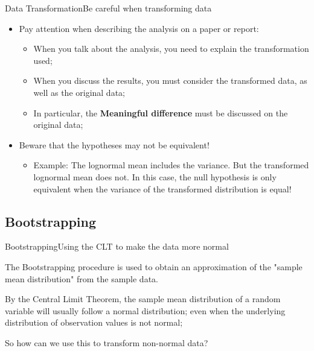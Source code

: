 \begin{frame}{Data Transformation}{Be careful when transforming data}
  \begin{itemize}
    \item Pay attention when describing the analysis on a paper or report:
    \begin{itemize}
      \item When you talk about the analysis, you need to explain the transformation used;

      \item When you discuss the results, you must consider the transformed data, as well as the original data;

      \item In particular, the {\bf Meaningful difference} must be discussed on the original data;
    \end{itemize}\bigskip

    \item Beware that the hypotheses may not be equivalent!
    \begin{itemize}
      \item Example: The lognormal mean includes the variance. But the transformed lognormal mean does not. In this case, the null hypothesis is only equivalent when the variance of the transformed distribution is equal!
    \end{itemize}
  \end{itemize}
\end{frame}

\subsection{Bootstrapping}

\begin{frame}{Bootstrapping}{Using the CLT to make the data more normal}

  The Bootstrapping procedure is used to obtain an approximation of the "sample mean distribution" from the sample data.\bigskip

  By the Central Limit Theorem, the sample mean distribution of a random variable will usually follow a normal distribution; even when the underlying distribution of observation values is not normal;\bigskip

  So how can we use this to transform non-normal data?
\end{frame}

